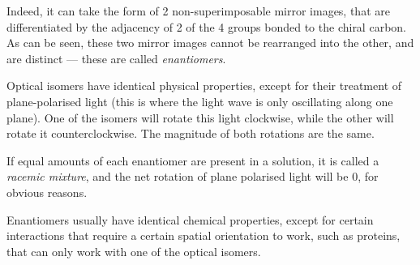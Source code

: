 
			Indeed, it can take the form of 2 non-superimposable mirror images, that are differentiated by the adjacency of 2 of
			the 4 groups bonded to the chiral carbon. As can be seen, these two mirror images cannot be rearranged into the other,
			and are distinct –– these are called \textit{enantiomers}.



			Optical isomers have identical physical properties, except for their treatment of plane-polarised light (this is
			where the light wave is only oscillating along one plane). One of the isomers will rotate this light clockwise, while the
			other will rotate it counterclockwise. The magnitude of both rotations are the same.

			If equal amounts of each enantiomer are present in a solution, it is called a \textit{racemic mixture}, and the net
			rotation of plane polarised light will be 0, for obvious reasons.

			Enantiomers usually have identical chemical properties, except for certain interactions that require a certain spatial
			orientation to work, such as proteins, that can only work with one of the optical isomers.

















